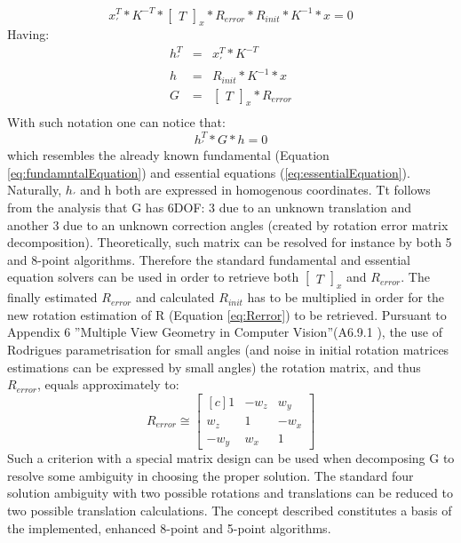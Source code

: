 \begin{equation} \label{eq:relativeFundamntalEnhanced}
{x}_{'}^{T} * K^{-T} * \begin{bmatrix}T\end{bmatrix}_{x} * R_{error} * R_{init} * K^{-1} * x = 0
\end{equation}
Having:
\begin{equation} \label{eq:leftRelative}
\begin{array}{lcl}
h_{'}^{T} &=& {x}_{'}^{T} * K^{-T} \\
h &=& R_{init} * K^{-1} * x \\
G &=& \begin{bmatrix}T\end{bmatrix}_{x} * R_{error} \\
\end{array}
\end{equation}
With such notation one can notice that:
\begin{equation} \label{eq:alternativeEnhancedEquation}
{h}_{'}^{T} * G * h = 0
\end{equation}
which resembles the already known fundamental (Equation \ref{eq:fundamntalEquation}) and essential equations (\ref{eq:essentialEquation}). Naturally, $h_{'}$ and h both are expressed in homogenous coordinates. Tt follows from the analysis that G has 6DOF: 3 due to an unknown translation and another 3 due to an unknown correction angles (created by rotation error matrix decomposition). Theoretically, such matrix can be resolved for instance by both 5 and 8-point algorithms. Therefore the standard fundamental and essential equation solvers can be used in order to retrieve both $\begin{bmatrix}T\end{bmatrix}_{x}$ and $R_{error}$.
The finally estimated $R_{error}$ and calculated $R_{init}$ has to be multiplied in order for the new rotation estimation of R (Equation \ref{eq:Rerror}) to be retrieved.
Pursuant to Appendix 6 ''Multiple View Geometry in Computer Vision''(A6.9.1 \cite{HartleyMultipleView}), the use of Rodrigues parametrisation for small angles (and noise in initial rotation matrices estimations can be expressed by small angles) the rotation matrix, and thus $R_{error}$, equals approximately to:
\begin{equation} \label{eq:rodiguesError}
R_{error} \cong 
\begin{bmatrix*}[c]
    1   &  -w_{z}&  w_{y}\\ 
 w_{z}  &    1   & -w_{x}\\
-w_{y}  &  w_{x} &   1
\end{bmatrix*}
\end{equation} 
Such a criterion with a special matrix design can be used when decomposing G to resolve some ambiguity in choosing the proper solution. The standard four solution ambiguity with two possible rotations and translations can be reduced to two possible translation calculations. The concept described constitutes a basis of the implemented, enhanced 8-point and 5-point algorithms.

